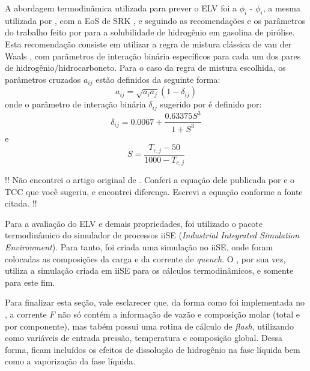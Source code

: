 A abordagem termodinâmica utilizada para prever o ELV foi a $\phi_i$ -
$\phi_i$, a mesma utilizada por , com a EoS de SRK
\cite{Soave1972}, e seguindo as recomendações e os parâmetros do trabalho feito
por  para a solubilidade de hidrogênio em gasolina de
pirólise. Esta recomendação consiste em utilizar a regra de mistura clássica de
van der Waals \cite{VanderWaals1873}, com parâmetros de interação binária
específicos para cada um dos pares de hidrogênio/hidrocarboneto. Para o caso da
regra de mistura escolhida, os parâmetros cruzados $a_{ij}$ estão definidos
da seguinte forma\cite{Peng1976,Soave1972}:
\begin{equation}
a_{ij} = \sqrt{a_ia_j}(1-\delta_{ij})
\label{eq:parametroaij}
\end{equation}
onde o parâmetro de interação binária $\delta_{ij}$ sugerido por
 é definido por:
\begin{equation}
\delta_{ij} = 0.0067+\dfrac{0.63375S^3}{1+S^3}
\label{eq:deltaij}
\end{equation}
e
\begin{equation}
S = \dfrac{T_{c,j}-50}{1000-T_{c,j}}
\label{eq:deltaij}
\end{equation}

!! Não encontrei o artigo original de \cite{Gray1985}. Conferi a equação dele
publicada por \cite{Rojas2014} e o TCC que você sugeriu, e encontrei diferença.
Escrevi a equação conforme a fonte citada. !!

Para a avaliação do ELV e demais propriedades, foi utilizado o pacote
termodinâmico do simulador de processos iiSE (\emph{Industrial Integrated
Simulation Environment}). Para tanto, foi criada uma simulação no iiSE, onde
foram colocadas as composições da carga e da corrente de \emph{quench}. O \emso,
por sua vez, utiliza a simulação criada em iiSE para os cálculos termodinâmicos,
e somente para este fim. 

Para finalizar esta seção, vale esclarecer que, da forma como foi implementada
no \emso, a corrente $F$ não só contém a informação de vazão e composição molar
(total e por componente), mas tabém possui uma rotina de cálculo de
\emph{flash}, utilizando como variáveis de entrada pressão, temperatura e
composição global. Dessa forma, ficam incluídos os efeitos de dissolução de
hidrogênio na fase líquida bem como a vaporização da fase líquida.


